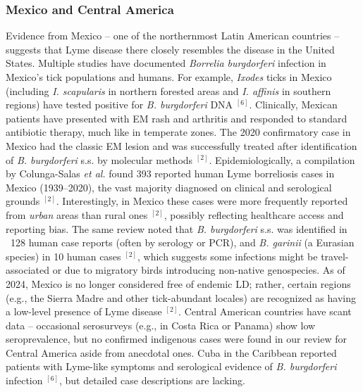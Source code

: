 \documentclass[11pt,letterpaper]{article}
\newcommand{\mycite}[1]{$^{[#1]}$}
\begin{document}
\subsubsection{Mexico and Central America}
Evidence from Mexico – one of the northernmost Latin American countries – suggests that Lyme disease there closely resembles the disease in the United States. Multiple studies have documented \textit{Borrelia burgdorferi} infection in Mexico's tick populations and humans. For example, \textit{Ixodes} ticks in Mexico (including \textit{I. scapularis} in northern forested areas and \textit{I. affinis} in southern regions) have tested positive for \textit{B. burgdorferi} DNA \mycite{6}. Clinically, Mexican patients have presented with EM rash and arthritis and responded to standard antibiotic therapy, much like in temperate zones. The 2020 confirmatory case in Mexico had the classic EM lesion and was successfully treated after identification of \textit{B. burgdorferi} s.s. by molecular methods \mycite{2}. Epidemiologically, a compilation by Colunga-Salas \textit{et al.} found 393 reported human Lyme borreliosis cases in Mexico (1939–2020), the vast majority diagnosed on clinical and serological grounds \mycite{2}. Interestingly, in Mexico these cases were more frequently reported from \textit{urban} areas than rural ones \mycite{2}, possibly reflecting healthcare access and reporting bias. The same review noted that \textit{B. burgdorferi} s.s. was identified in ~128 human case reports (often by serology or PCR), and \textit{B. garinii} (a Eurasian species) in 10 human cases \mycite{2}, which suggests some infections might be travel-associated or due to migratory birds introducing non-native genospecies. As of 2024, Mexico is no longer considered free of endemic LD; rather, certain regions (e.g., the Sierra Madre and other tick-abundant locales) are recognized as having a low-level presence of Lyme disease \mycite{2}. Central American countries have scant data – occasional serosurveys (e.g., in Costa Rica or Panama) show low seroprevalence, but no confirmed indigenous cases were found in our review for Central America aside from anecdotal ones. Cuba in the Caribbean reported patients with Lyme-like symptoms and serological evidence of \textit{B. burgdorferi} infection \mycite{6}, but detailed case descriptions are lacking.
\end{document}
